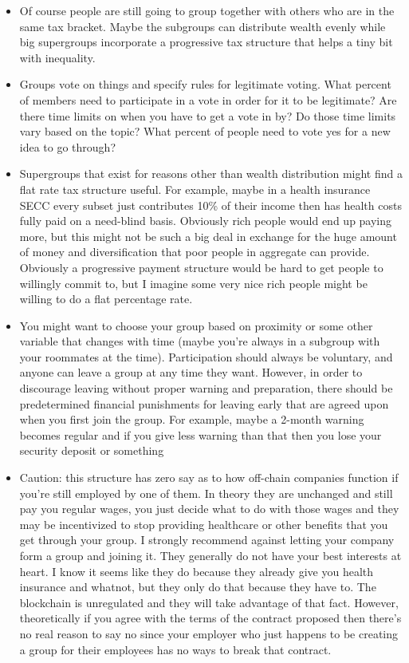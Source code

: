 \documentclass{article}[10pt]
\begin{document}
\begin{itemize}
    \item Of course people are still going to group together with others who are in the same tax bracket. 
    Maybe the subgroups can distribute wealth evenly while big supergroups incorporate a progressive tax structure that helps a tiny bit with inequality. 
    
    \item Groups vote on things and specify rules for legitimate voting. 
    What percent of members need to participate in a vote in order for it to be legitimate? 
    Are there time limits on when you have to get a vote in by? Do those time limits vary based on the topic? 
    What percent of people need to vote yes for a new idea to go through?
    
    \item Supergroups that exist for reasons other than wealth distribution might find a flat rate tax structure useful.
    For example, maybe in a health insurance SECC every subset just contributes 10\% of their income then has health costs fully paid on a need-blind basis. 
    Obviously rich people would end up paying more, but this might not be such a big deal in exchange for the huge amount of money and diversification that poor people in aggregate can provide.
    Obviously a progressive payment structure would be hard to get people to willingly commit to, but I imagine some very nice rich people might be willing to do a flat percentage rate.
    
    \item You might want to choose your group based on proximity or some other variable that changes with time (maybe you're always in a subgroup with your roommates at the time).
    Participation should always be voluntary, and anyone can leave a group at any time they want. 
    However, in order to discourage leaving without proper warning and preparation, there should be predetermined financial punishments for leaving early that are agreed upon when you first join the group.
    For example, maybe a 2-month warning becomes regular and if you give less warning than that then you lose your security deposit or something
    
    \item Caution: this structure has zero say as to how off-chain companies function if you're still employed by one of them. 
    In theory they are unchanged and still pay you regular wages, you just decide what to do with those wages and they may be incentivized to stop providing healthcare or other benefits that you get through your group. 
    I strongly recommend against letting your company form a group and joining it. 
    They generally do not have your best interests at heart.
    I know it seems like they do because they already give you health insurance and whatnot, but they only do that because they have to.
    The blockchain is unregulated and they will take advantage of that fact.
    However, theoretically if you agree with the terms of the contract proposed then there's no real reason to say no since your employer who just happens to be creating a group for their employees has no ways to break that contract.
    

\end{itemize}
\end{document}
